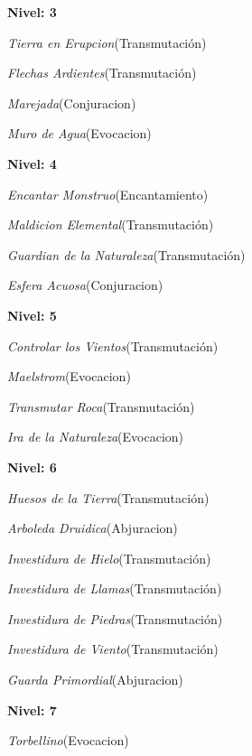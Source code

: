 \documentclass[a4paper,twocolumn,openany,10pt]{dndbook}
\begin{document}
\begin{list}{}{}
	\item \textbf{Nivel: 3}
	\begin{list}{}{}
		\item \textit{Tierra en Erupcion}(Transmutación)
		\item \textit{Flechas Ardientes}(Transmutación)
		\item \textit{Marejada}(Conjuracion)
		\item \textit{Muro de Agua}(Evocacion)
	\end{list}

	\item \textbf{Nivel: 4}
	\begin{list}{}{}
		\item \textit{Encantar Monstruo}(Encantamiento)
		\item \textit{Maldicion Elemental}(Transmutación)
		\item \textit{Guardian de la Naturaleza}(Transmutación)
		\item \textit{Esfera Acuosa}(Conjuracion)
	\end{list}

	\item \textbf{Nivel: 5}
	\begin{list}{}{}
		\item \textit{Controlar los Vientos}(Transmutación)
		\item \textit{Maelstrom}(Evocacion)
		\item \textit{Transmutar Roca}(Transmutación)
		\item \textit{Ira de la Naturaleza}(Evocacion)
	\end{list}

	\item \textbf{Nivel: 6}
	\begin{list}{}{}
		\item \textit{Huesos de la Tierra}(Transmutación)
		\item \textit{Arboleda Druidica}(Abjuracion)
		\item \textit{Investidura de Hielo}(Transmutación)
		\item \textit{Investidura de Llamas}(Transmutación)
		\item \textit{Investidura de Piedras}(Transmutación)
		\item \textit{Investidura de Viento}(Transmutación)
		\item \textit{Guarda Primordial}(Abjuracion)
	\end{list}

	\item \textbf{Nivel: 7}
	\begin{list}{}{}
		\item \textit{Torbellino}(Evocacion)
	\end{list}
\end{list}
\end{document}
